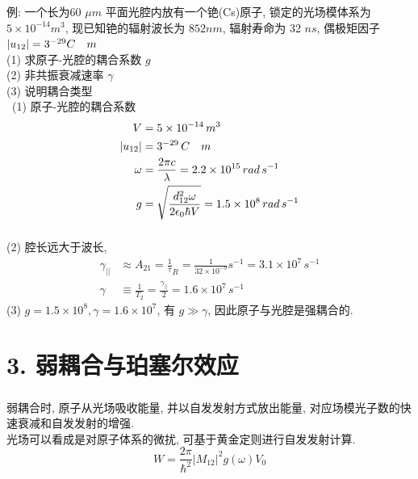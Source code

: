 \begin{frame} 
\frametitle{}
     例: 一个长为60 $\mu m$ 平面光腔内放有一个铯(Cs)原子, 锁定的光场模体系为 $5\times 10 ^{-14} m^3$, 现已知铯的辐射波长为 $852 nm$, 辐射寿命为 32 $ns$, 偶极矩因子$\left|u_{12}\right|= 3\time 10 ^{-29} C \quad m $  \\ 
     (1) 求原子-光腔的耦合系数 $g$ \\
     (2) 非共振衰减速率 $\gamma$  \\ 
     (3) 说明耦合类型 \\ 
    \解 ~(1) 原子-光腔的耦合系数
    \[ \begin{aligned}
        V &= 5\times 10 ^{-14} \,m^3 \\
        \left|u_{12}\right| &= 3\time 10 ^{-29} \,C \quad m \\
        \omega &= \frac{2\pi c}{\lambda} = 2.2\times 10^{15} \,rad\, s^{-1} \\ 
        g &= \sqrt{ \frac{d^2 _{12}\omega}{2  \epsilon_0 \hbar V}} = 1.5 \times 10^8 \,rad\, s^{-1}
    \end{aligned}\] 
    \end{frame}
    
    \begin{frame} 
    \frametitle{}  
    (2) 腔长远大于波长, 
    \[ \begin{aligned} 
        \gamma_{||} & \approx A_{21}= \frac{1}{\tau}_R = \frac{1}{32\times 10^{-9}} s^{-1}=  3.1 \times 10^7  \, s^{-1} \\ 
        \gamma & \equiv \frac{1}{T_2} =  \frac{\gamma_{||}}{2} = 1.6 \times 10^7  \,s^{-1}
    \end{aligned}\] 
    (3) $ g = 1.5 \times 10^8, \gamma= 1.6 \times 10^7$, 有 $g \gg \gamma$, 因此原子与光腔是强耦合的.
\end{frame}

\section{3. 弱耦合与珀塞尔效应}

\begin{frame} 
\frametitle{}
{\Bullet}弱耦合时, 原子从光场吸收能量, 并以自发发射方式放出能量, 对应场模光子数的快速衰减和自发发射的增强. \\  {\vspace*{2.3em}}
{\Bullet}光场可以看成是对原子体系的微扰, 可基于黄金定则进行自发发射计算.
\[ W = \frac{2\pi}{\hbar^2} \left|M_{12}\right|^2 g(\omega) V_0\]
\end{frame}

